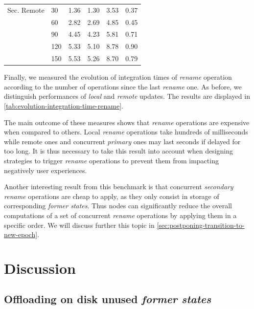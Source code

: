 \documentclass[10pt,journal,compsoc]{IEEEtran}
\begin{document}
\begin{table}[t!]
{\begin{tabular}{llrrrr}
            Sec. Remote & 30  &     1.36 &     1.30 &       3.53 &   0.37 \\
                                    & 60  &     2.82 &     2.69 &       4.85 &   0.45 \\
                                    & 90  &     4.45 &     4.23 &       5.81 &   0.71 \\
                                    & 120 &     5.33 &     5.10 &       8.78 &   0.90 \\
                                    & 150 &     5.53 &     5.26 &       8.70 &   0.79 \\
            \bottomrule
        \end{tabular}
    }
\end{table}

Finally, we measured the evolution of integration times of \emph{rename} operation according to the number of operations since the last \emph{rename} one.
As before, we distinguish performances of \emph{local} and \emph{remote} updates.
The results are displayed in \autoref{tab:evolution-integration-time-rename}.

The main outcome of these measures shows that \emph{rename} operations are expensive when compared to others.
Local \emph{rename} operations take hundreds of milliseconds while remote ones and concurrent \emph{primary} ones may last seconds if delayed for too long.
It is thus necessary to take this result into account when designing strategies to trigger \emph{rename} operations to prevent them from impacting negatively user experiences.

Another interesting result from this benchmark is that concurrent \emph{secondary rename} operations are cheap to apply, as they only consist in storage of corresponding \emph{former states}.
Thus nodes can significantly reduce the overall computations of a set of concurrent \emph{rename} operations by applying them in a specific order.
We will discuss further this topic in \autoref{sec:postponing-transition-to-new-epoch}.

\section{Discussion}

\label{sec:discussion}

\subsection{Offloading on disk unused \emph{former states}}
\label{sec:offloading-former-states}
\end{document}
